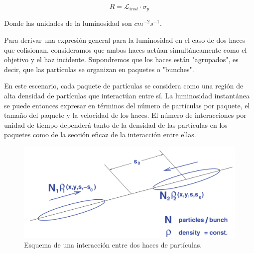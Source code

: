 \begin{equation}
R=\mathcal{L}_{inst} \cdot \sigma_{p}
\end{equation}

Donde las unidades de la luminosidad son $cm^{-2}s^{-1}$. 

Para derivar una expresión general para la luminosidad en el caso de dos haces que colisionan, consideramos que ambos haces actúan simultáneamente como el objetivo y el haz incidente. Supondremos que los haces están "agrupados", es decir, que las partículas se organizan en paquetes o "bunches". 

En este escenario, cada paquete de partículas se considera como una región de alta densidad de partículas que interactúan entre sí. La luminosidad instantánea se puede entonces expresar en términos del número de partículas por paquete, el tamaño del paquete y la velocidad de los haces. El número de interacciones por unidad de tiempo dependerá tanto de la densidad de las partículas en los paquetes como de la sección eficaz de la interacción entre ellas.

\begin{center}
  \begin{figure}[h!]
    \centering
\includegraphics[scale=.25]{Chapter1/luminosity.png} 
 \caption[Interacción entre dos haces de partículas]{Esquema de una interacción entre dos haces de partículas\cite{concept_of_luminosity}.}
    \label{luminosity}
  \end{figure}
\end{center}



